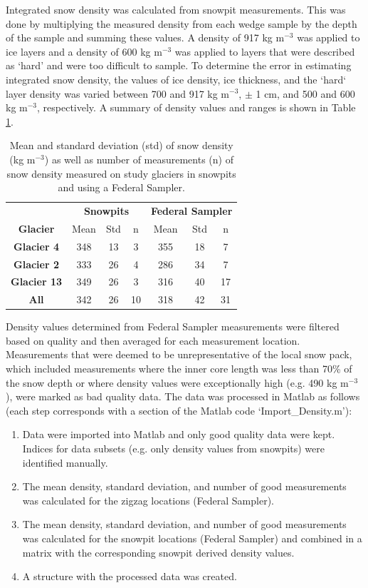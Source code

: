 \documentclass[12pt]{article}
\begin{document}
Integrated snow density was calculated from snowpit measurements. This was done by multiplying the measured density from each wedge sample by the depth of the sample and summing these values. A density of 917 kg m$^{-3}$ was applied to ice layers and a density of 600 kg m$^{-3}$ was applied to layers that were described as `hard' and were too difficult to sample. To determine the error in estimating integrated snow density, the values of ice density, ice thickness, and the `hard` layer density was varied between 700 and 917 kg m$^{-3}$, $\pm$ 1 cm, and 500 and 600 kg m$^{-3}$, respectively.  A summary of density values and ranges is shown in Table \ref{tab:density_stats}.

\begin{table}[b!]
\centering
\caption{Mean and standard deviation (std) of snow density (kg m$^{-3}$) as well as number of measurements (n) of snow density measured on study glaciers in snowpits and using a Federal Sampler. }
\label{tab:density_stats}
\begin{tabular}{ccccccc}
 & \multicolumn{3}{c}{\textbf{Snowpits}} & \multicolumn{3}{c}{\textbf{Federal Sampler}} \\
\multirow{-2}{*}{\textbf{Glacier}} & Mean & Std & n & Mean & Std & n \\ \hline
\textbf{Glacier 4} & 348 & 13 & 3 & 355 & 18 & 7 \\
\textbf{Glacier 2} & 333 & 26 & 4 & 286 & 34 & 7 \\
\textbf{Glacier 13} & 349 & 26 & 3 & 316 & 40 & 17 \\
\rowcolor[HTML]{EFEFEF} 
\textbf{All} & 342 & 26 & 10 & 318 & 42 & 31
\end{tabular}
\end{table}

Density values determined from Federal Sampler measurements were filtered based on quality and then averaged for each measurement location. Measurements that were deemed to be unrepresentative of the local snow pack, which included measurements where the inner core length was less than 70\% of the snow depth or where density values were exceptionally high (e.g. 490 kg m$^{-3}$), were marked as bad quality data. The data was processed in Matlab as follows (each step corresponds with a section of the Matlab code `Import\_Density.m'): 
\begin{enumerate}
\item Data were imported into Matlab and only good quality data were kept. Indices for data subsets (e.g. only density values from snowpits) were identified manually. 
\item The mean density, standard deviation, and number of good measurements was calculated for the zigzag locations (Federal Sampler).
\item The mean density, standard deviation, and number of good measurements was calculated for the snowpit locations (Federal Sampler) and combined in a matrix with the corresponding snowpit derived density values.
\item A structure with the processed data was created.
\end{enumerate}
\end{document}
